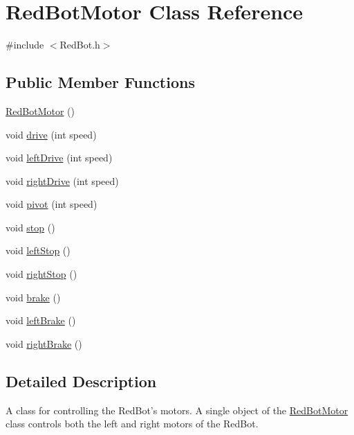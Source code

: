 \hypertarget{class_red_bot_motor}{\section{Red\-Bot\-Motor Class Reference}
\label{class_red_bot_motor}
}


{\ttfamily \#include $<$Red\-Bot.\-h$>$}

\subsection*{Public Member Functions}
\begin{DoxyCompactItemize}
\item 
\hyperlink{class_red_bot_motor_ae2c204ef267fe9bde43cf6caeb693eae}{Red\-Bot\-Motor} ()
\item 
void \hyperlink{class_red_bot_motor_a92a78cd6ecaf47cb50b1c8059375c261}{drive} (int speed)
\item 
void \hyperlink{class_red_bot_motor_aeef7a9abd94a74ea87860163ecad6764}{left\-Drive} (int speed)
\item 
void \hyperlink{class_red_bot_motor_acf1246d90ff26ec68748e16e7d80e78b}{right\-Drive} (int speed)
\item 
void \hyperlink{class_red_bot_motor_a61a73a2dd543697bc966bbb0de47a81d}{pivot} (int speed)
\item 
void \hyperlink{class_red_bot_motor_a2e55b7f88c4c081928370fe711ca61ef}{stop} ()
\item 
void \hyperlink{class_red_bot_motor_ac757e02db079bc5a57774b4c7bbc3737}{left\-Stop} ()
\item 
void \hyperlink{class_red_bot_motor_affb91e6e7205c9df1482bb58f0c0ed05}{right\-Stop} ()
\item 
void \hyperlink{class_red_bot_motor_a64540ac32e023eff2c93fd60f0537562}{brake} ()
\item 
void \hyperlink{class_red_bot_motor_a1fbd19b1b3ef733664397c183bb910ea}{left\-Brake} ()
\item 
void \hyperlink{class_red_bot_motor_a710584b709cd8a7a7070cbbf3d0a6ed6}{right\-Brake} ()
\end{DoxyCompactItemize}


\subsection{Detailed Description}
A class for controlling the Red\-Bot's motors. A single object of the \hyperlink{class_red_bot_motor}{Red\-Bot\-Motor} class controls both the left and right motors of the Red\-Bot. 

